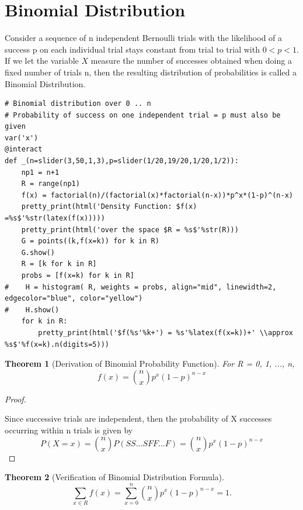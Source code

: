 \documentclass[10pt,]{book}
\theoremstyle{plain}
\newtheorem{theorem}{Theorem}[section]
\theoremstyle{definition}
\theoremstyle{definition}
\theoremstyle{definition}
\numberwithin{equation}{section}
\newcommand{\lt}{ < }
\begin{document}
\section[{Binomial Distribution}]{Binomial Distribution}\label{section-30}
Consider a sequence  of n independent Bernoulli trials with the likelihood of a success p on each individual trial stays constant from trial to trial with \( 0 \lt p \lt 1 \). If we let the variable \(X\) measure the number of successes obtained when doing a fixed number of trials n, then the resulting distribution of probabilities is called a Binomial Distribution.%
\begin{lstlisting}[style=sageinput]
# Binomial distribution over 0 .. n
# Probability of success on one independent trial = p must also be given
var('x')
@interact
def _(n=slider(3,50,1,3),p=slider(1/20,19/20,1/20,1/2)):
    np1 = n+1
    R = range(np1)
    f(x) = factorial(n)/(factorial(x)*factorial(n-x))*p^x*(1-p)^(n-x)
    pretty_print(html('Density Function: $f(x) =%s$'%str(latex(f(x)))))
    pretty_print(html('over the space $R = %s$'%str(R)))
    G = points((k,f(x=k)) for k in R)
    G.show()
    R = [k for k in R]
    probs = [f(x=k) for k in R]
#    H = histogram( R, weights = probs, align="mid", linewidth=2, edgecolor="blue", color="yellow")
#    H.show()
    for k in R:
        pretty_print(html('$f(%s'%k+') = %s'%latex(f(x=k))+' \\approx %s$'%f(x=k).n(digits=5)))
\end{lstlisting}
\begin{theorem}[{Derivation of Binomial Probability Function}]\label{theorem-37}
 For R = {0, 1, ..., n},
	\begin{equation*}f(x) = \binom{n}{x}p^x(1-p)^{n-x}\end{equation*}\end{theorem}
\begin{proof}\hypertarget{proof-34}{}
 Since successive trials are independent, then the probability of X successes occurring within n trials is given by 
		\begin{equation*}P(X=x) = \binom{n}{x}P(SS...SFF...F) = 		
						\binom{n}{x}p^x(1-p)^{n-x}\end{equation*}
\end{proof}
\begin{theorem}[{Verification of Binomial Distribution Formula}]\label{theorem-38}
\begin{equation*}\sum_{x \in R} f(x) = \sum_{x=0}^n \binom{n}{x}p^x(1-p)^{n-x} = 1.\end{equation*}\end{theorem}
\end{document}
